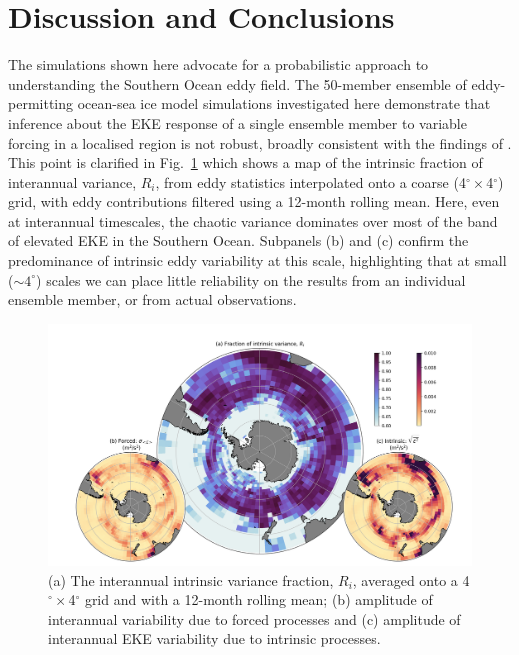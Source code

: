 \documentclass[linenumbers]{agujournal2019}
\begin{document}
\section{Discussion and Conclusions}
The simulations shown here advocate for a probabilistic approach to understanding the Southern Ocean eddy field.
The 50-member ensemble of eddy-permitting ocean-sea ice model simulations investigated here demonstrate that inference about the EKE response of a single ensemble member to variable forcing in a localised region is not robust, broadly consistent with the findings of \citet{Zhang2021}.
This point is clarified in Fig.~\ref{Fig:6} which shows a map of the intrinsic fraction of interannual variance, $R_i$, from eddy statistics interpolated onto a coarse (4$^\circ \times$4$^\circ$) grid, with eddy contributions filtered using a 12-month rolling mean.
Here, even at interannual timescales, the chaotic variance dominates over most of the band of elevated EKE in the Southern Ocean. 
Subpanels (b) and (c) confirm the predominance of intrinsic eddy variability at this scale, highlighting that at small ($\sim 4^\circ$) scales we can place little reliability on the results from an individual ensemble member, or from actual observations.

\begin{figure}[t]
\begin{center}
\includegraphics[width=\hsize]{Figure7}
\caption{(a) The interannual intrinsic variance fraction, $R_i$, averaged onto a  4$^\circ \times$4$^\circ$ grid and with a 12-month rolling mean; (b) amplitude of interannual variability due to forced processes and (c) amplitude of interannual EKE variability due to intrinsic processes.
 }
\label{Fig:6}
\end{center}
\end{figure}
\end{document}
